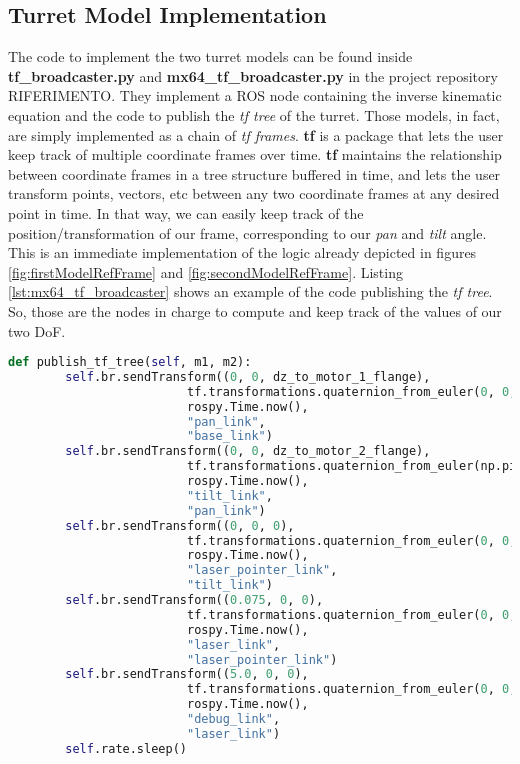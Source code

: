\subsection{Turret Model Implementation}
The code to implement the two turret models can be found inside \textbf{tf\_broadcaster.py} and \textbf{mx64\_tf\_broadcaster.py} in the project repository RIFERIMENTO. They implement a ROS node containing the inverse kinematic equation and the code to publish the \emph{tf tree} of the turret. Those models, in fact, are simply implemented as a chain of \emph{tf frames}. \textbf{tf} is a package that lets the user keep track of multiple coordinate frames over time. \textbf{tf} maintains the relationship between coordinate frames in a tree structure buffered in time, and lets the user transform points, vectors, etc between any two coordinate frames at any desired point in time. In that way, we can easily keep track of the position/transformation of our frame, corresponding to our \emph{pan} and \emph{tilt} angle. This is an immediate implementation of the logic already depicted in figures \ref{fig:firstModelRefFrame} and \ref{fig:secondModelRefFrame}. Listing \ref{lst:mx64_tf_broadcaster} shows an example of the code publishing the \emph{tf tree}.\\
So, those are the nodes in charge to compute and keep track of the values of our two DoF.
\begin{lstlisting}[caption={tf tree publisher of the MX-64 based turret},label={lst:mx64_tf_broadcaster},language=Python]
def publish_tf_tree(self, m1, m2):
        self.br.sendTransform((0, 0, dz_to_motor_1_flange),
                         tf.transformations.quaternion_from_euler(0, 0, m1),
                         rospy.Time.now(),
                         "pan_link",
                         "base_link")
        self.br.sendTransform((0, 0, dz_to_motor_2_flange),
                         tf.transformations.quaternion_from_euler(np.pi/2, -np.pi/2, 0),
                         rospy.Time.now(),
                         "tilt_link",
                         "pan_link")
        self.br.sendTransform((0, 0, 0),
                         tf.transformations.quaternion_from_euler(0, 0, m2 - np.pi/2),
                         rospy.Time.now(),
                         "laser_pointer_link",
                         "tilt_link")
        self.br.sendTransform((0.075, 0, 0),
                         tf.transformations.quaternion_from_euler(0, 0, -np.pi/2),
                         rospy.Time.now(),
                         "laser_link",
                         "laser_pointer_link")
        self.br.sendTransform((5.0, 0, 0),
                         tf.transformations.quaternion_from_euler(0, 0, 0),
                         rospy.Time.now(),
                         "debug_link",
                         "laser_link")
        self.rate.sleep()
\end{lstlisting}
